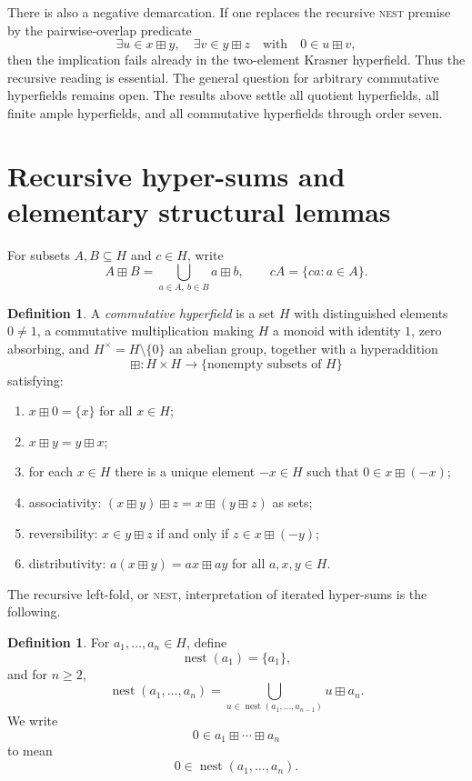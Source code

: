 \documentclass[12pt]{article}
\theoremstyle{definition}
\newtheorem{definition}[theorem]{Definition}
\theoremstyle{remark}
\numberwithin{equation}{section}
\newcommand{\nest}{\operatorname{nest}}
\begin{document}
There is also a negative demarcation. If one replaces the recursive \textsc{nest} premise by the pairwise-overlap predicate
\[
\exists u\in x\boxplus y,\quad \exists v\in y\boxplus z
\quad\text{with}\quad
0\in u\boxplus v,
\]
then the implication fails already in the two-element Krasner hyperfield. Thus the recursive reading is essential.
The general question for arbitrary commutative hyperfields remains open. The results above settle all quotient hyperfields, all finite ample hyperfields, and all commutative hyperfields through order seven.

\section{Recursive hyper-sums and elementary structural lemmas}
\label{sec:prelim}

For subsets \(A,B\subseteq H\) and \(c\in H\), write
\[
A\boxplus B=\bigcup_{a\in A,\ b\in B}a\boxplus b,
\qquad
cA=\{ca:a\in A\}.
\]

\begin{definition}\label{def:hyperfield}
A \emph{commutative hyperfield} is a set \(H\) with distinguished elements \(0\neq 1\), a commutative multiplication making \(H\) a monoid with identity \(1\), zero absorbing, and \(H^\times=H\setminus\{0\}\) an abelian group, together with a hyperaddition
\[
\boxplus:H\times H\to \{\text{nonempty subsets of }H\}
\]
satisfying:
\begin{enumerate}
\item \(x\boxplus 0=\{x\}\) for all \(x\in H\);
\item \(x\boxplus y=y\boxplus x\);
\item for each \(x\in H\) there is a unique element \(-x\in H\) such that \(0\in x\boxplus(-x)\);
\item associativity: \((x\boxplus y)\boxplus z=x\boxplus(y\boxplus z)\) as sets;
\item reversibility: \(x\in y\boxplus z\) if and only if \(z\in x\boxplus(-y)\);
\item distributivity: \(a(x\boxplus y)=ax\boxplus ay\) for all \(a,x,y\in H\).
\end{enumerate}
\end{definition}

The recursive left-fold, or \textsc{nest}, interpretation of iterated hyper-sums is the following.

\begin{definition}\label{def:nest}
For \(a_1,\dots,a_n\in H\), define
\[
\nest(a_1)=\{a_1\},
\]
and for \(n\ge 2\),
\[
\nest(a_1,\dots,a_n)
=
\bigcup_{u\in \nest(a_1,\dots,a_{n-1})} u\boxplus a_n.
\]
We write
\[
0\in a_1\boxplus\cdots\boxplus a_n
\]
to mean
\[
0\in \nest(a_1,\dots,a_n).
\]
\end{definition}
\end{document}
